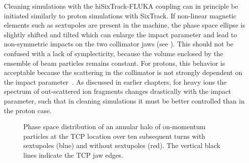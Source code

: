 Cleaning simulations with the hiSixTrack-FLUKA coupling can in principle be initiated similarly to proton simulations with SixTrack.  If non-linear magnetic elements such as sextupoles are present in the machine, the phase space ellipse is slightly shifted and tilted which can enlarge the impact parameter and lead to non-symmetric impacts on the two collimator jaws (see ). This should not be confused with a lack of symplecticity, because the volume enclosed by the ensemble of beam particles remains constant. For protons, this behavior is acceptable because the scattering in the collimator is not strongly dependent on the impact parameter~\cite{Bruce2014a}. As discussed in earlier chapters, for heavy ions the spectrum of out-scattered ion fragments changes drastically with the impact parameter, such that in cleaning simulations it must be better controlled than in the proton case.


\begin{figure}[b]
  \centering
  \caption{Phase space distribution of an annular halo of on-momentum particles at the TCP location over ten subsequent turns with sextupoles (blue) and without sextupoles (red). The vertical black lines indicate the TCP jaw edges.}  
  \label{pic:16070603}
  \end{figure}

